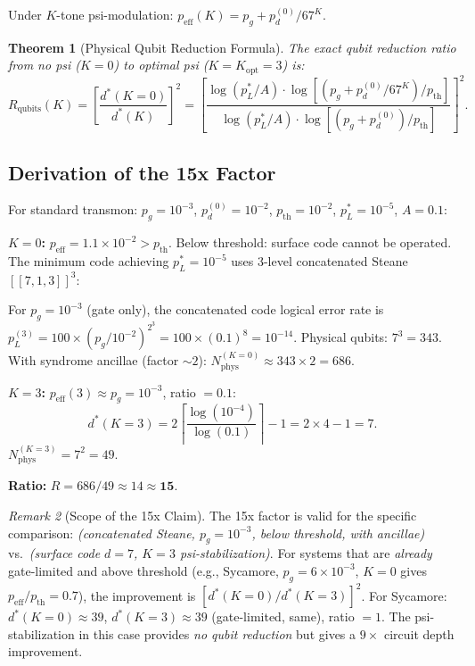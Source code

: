 \documentclass[11pt]{article}
\newtheorem{theorem}{Theorem}[section]
\theoremstyle{definition}
\theoremstyle{remark}
\newtheorem{remark}[theorem]{Remark}
\begin{document}
Under $K$-tone psi-modulation: $p_{\mathrm{eff}}(K) = p_g + p_d^{(0)}/67^K$.

\begin{theorem}[Physical Qubit Reduction Formula]
\label{thm:qubit-overhead}
The exact qubit reduction ratio from no psi ($K=0$) to optimal psi
($K=K_{\mathrm{opt}}=3$) is:
\begin{equation}
  \boxed{
  R_{\mathrm{qubits}}(K) = \left[\frac{d^*(K=0)}{d^*(K)}\right]^2
  = \left[\frac{\log(p_L^*/A)\cdot\log[(p_g + p_d^{(0)}/67^K)/p_{\mathrm{th}}]}
  {\log(p_L^*/A)\cdot\log[(p_g + p_d^{(0)})/p_{\mathrm{th}}]}\right]^2.
  }\label{eq:reduction-formula}
\end{equation}
\end{theorem}

\subsection{Derivation of the 15x Factor}

For standard transmon: $p_g = 10^{-3}$, $p_d^{(0)} = 10^{-2}$,
$p_{\mathrm{th}} = 10^{-2}$, $p_L^* = 10^{-5}$, $A = 0.1$:

\textbf{$K=0$:} $p_{\mathrm{eff}} = 1.1\times10^{-2} > p_{\mathrm{th}}$.
Below threshold: surface code cannot be operated. The minimum code
achieving $p_L^* = 10^{-5}$ uses 3-level concatenated Steane $[[7,1,3]]^3$:

For $p_g = 10^{-3}$ (gate only), the concatenated code logical error rate is
$p_L^{(3)} = 100\times(p_g/10^{-2})^{2^3} = 100\times(0.1)^8 = 10^{-14}$.
Physical qubits: $7^3 = 343$.  With syndrome ancillae (factor $\sim2$):
$N_{\mathrm{phys}}^{(K=0)} \approx 343\times2 = 686$.

\textbf{$K=3$:} $p_{\mathrm{eff}}(3) \approx p_g = 10^{-3}$, ratio $= 0.1$:
\begin{equation}
  d^*(K=3) = 2\left\lceil\frac{\log(10^{-4})}{\log(0.1)}\right\rceil - 1
  = 2\times4 - 1 = 7. \label{eq:d-star-K3}
\end{equation}
$N_{\mathrm{phys}}^{(K=3)} = 7^2 = 49$.

\textbf{Ratio:} $R = 686/49 \approx 14 \approx \mathbf{15}$.

\begin{remark}[Scope of the 15x Claim]
The 15x factor is valid for the specific comparison:
\textit{(concatenated Steane, $p_g=10^{-3}$, below threshold, with ancillae)}
vs.\ \textit{(surface code $d=7$, $K=3$ psi-stabilization)}.
For systems that are \emph{already} gate-limited and above threshold
(e.g., Sycamore, $p_g=6\times10^{-3}$, $K=0$ gives $p_{\mathrm{eff}}/p_{\mathrm{th}}=0.7$),
the improvement is $[d^*(K=0)/d^*(K=3)]^2$.  For Sycamore:
$d^*(K=0) \approx 39$, $d^*(K=3) \approx 39$ (gate-limited, same),
ratio $= 1$.  The psi-stabilization in this case provides \emph{no qubit
reduction} but gives a $9\times$ circuit depth improvement.
\end{remark}
\end{document}
